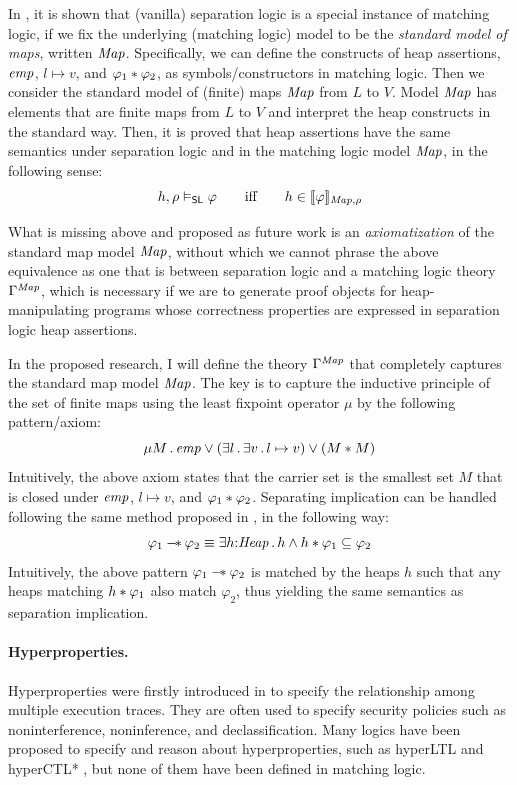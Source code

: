 \documentclass[11pt]{article}
\begin{document}
In \cite{Ros17}, it is shown that (vanilla) separation logic is a special 
instance of matching logic, if we fix the underlying (matching logic) model to be the \emph{standard model of maps}, written $\mathit{Map}$.
Specifically, 
we can define the constructs of heap assertions,
$\mathit{emp}$, $l \mapsto v$, and $\varphi_1 \mathbin{*} \varphi_2$, as symbols/constructors in 
matching logic. 
Then we consider the standard model of (finite) maps $\mathit{Map}$ from $L$ to $V$. 
Model $\mathit{Map}$ has elements that are finite maps from $L$ to $V$
and interpret the heap constructs in the standard way. 
Then, it is proved that heap assertions have the same semantics under 
separation logic and in the matching logic model $\mathit{Map}$, in the following sense:
$$
h,\rho \vDash_\mathsf{SL} \varphi \qquad\text{iff}\qquad
h \in [\![\varphi]\!]_{\mathit{Map},\rho}
$$

What is missing above and proposed as future work 
is an \emph{axiomatization}
of the standard map model $\mathit{Map}$, without which we cannot phrase the above 
equivalence as one that is between separation logic and a matching logic 
theory $\Gamma^{\mathit{Map}}$, which is necessary if we are to generate proof objects
for heap-manipulating programs whose correctness properties are expressed in 
separation logic heap assertions. 

In the proposed research, I will define the theory $\Gamma^{\mathit{Map}}$ that 
completely captures the standard map model $\mathit{Map}$. 
The key is to capture the inductive principle of the set of finite maps using 
the least fixpoint operator $\mu$ by the following pattern/axiom:
$$
\mu M \,.\, \mathit{emp} \vee (\exists l \,.\, \exists v \,.\, l \mapsto v) \vee
(M \mathbin{*} M)
$$
Intuitively, the above axiom states that the carrier set is the smallest set 
$M$ that is closed under $\mathit{emp}$, $l \mapsto v$, and $\varphi_1 \mathbin{*} 
\varphi_2$. 
Separating implication can be handled following the same method proposed in \cite{Ros17}, in the following way:
$$
\varphi_1 \mathbin{-\!*} \varphi_2 \equiv \exists h {:} \mathit{Heap} \,.\, h \land 
h \mathbin{*} \varphi_1 \subseteq \varphi_2
$$
Intuitively, the above pattern $\varphi_1 \mathbin{-\!*} \varphi_2$ is matched by the heaps $h$ such that any heaps matching $h \mathbin{*} \varphi_1$ also match $\varphi_2$, thus yielding the same semantics as separation implication.

\paragraph{Hyperproperties.}

Hyperproperties were firstly introduced in \cite{CS10} to specify the 
relationship among multiple execution traces. 
They are often used to specify security policies such as
noninterference, noninference, and declassification.
Many logics have been proposed to specify and reason about hyperproperties,
such as hyperLTL and hyperCTL* \cite{CFK14}, 
but none of them have been defined in matching logic. 
\end{document}
